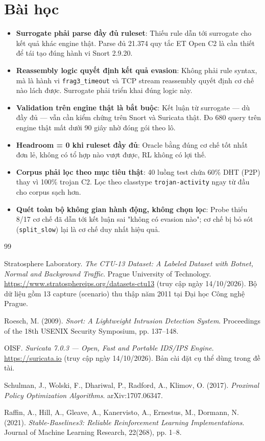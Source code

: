 \documentclass[12pt, a4paper, openany]{book}
\begin{document}
\section{Bài học}

\begin{itemize}
    \item \textbf{Surrogate phải parse đầy đủ ruleset}: Thiếu rule dẫn tới surrogate cho kết quả khác engine thật. Parse đủ 21.374 quy tắc ET Open C2 là cần thiết để tái tạo đúng hành vi Snort 2.9.20.
    \item \textbf{Reassembly logic quyết định kết quả evasion}: Không phải rule syntax, mà là hành vi \texttt{frag3\_timeout} và TCP stream reassembly quyết định cơ chế nào lách được. Surrogate phải triển khai đúng logic này.
    \item \textbf{Validation trên engine thật là bắt buộc}: Kết luận từ surrogate — dù đầy đủ — vẫn cần kiểm chứng trên Snort và Suricata thật. Đo 680 query trên engine thật mất dưới 90 giây nhờ đóng gói theo lô.
    \item \textbf{Headroom = 0 khi ruleset đầy đủ}: Oracle bằng đúng cơ chế tốt nhất đơn lẻ, không có tổ hợp nào vượt được, RL không có lợi thế.
    \item \textbf{Corpus phải lọc theo mục tiêu thật}: 40 luồng test chứa 60\% DHT (P2P) thay vì 100\% trojan C2. Lọc theo classtype \texttt{trojan-activity} ngay từ đầu cho corpus sạch hơn.
    \item \textbf{Quét toàn bộ không gian hành động, không chọn lọc}: Probe thiếu 8/17 cơ chế đã dẫn tới kết luận sai "không có evasion nào"; cơ chế bị bỏ sót (\texttt{split\_slow}) lại là cơ chế duy nhất hiệu quả.
\end{itemize}

\backmatter

\begin{thebibliography}{99}

 Stratosphere Laboratory. \textit{The CTU-13 Dataset: A Labeled Dataset with Botnet, Normal and Background Traffic}. Prague University of Technology. \url{https://www.stratosphereips.org/datasets-ctu13} (truy cập ngày 14/10/2026). Bộ dữ liệu gồm 13 capture (scenario) thu thập năm 2011 tại Đại học Công nghệ Prague.

 Roesch, M. (2009). \textit{Snort: A Lightweight Intrusion Detection System}. Proceedings of the 18th USENIX Security Symposium, pp. 137--148.

 OISF. \textit{Suricata 7.0.3 --- Open, Fast and Portable IDS/IPS Engine}. \url{https://suricata.io} (truy cập ngày 14/10/2026). Bản cài đặt cụ thể dùng trong đề tài.

 Schulman, J., Wolski, F., Dhariwal, P., Radford, A., Klimov, O. (2017). \textit{Proximal Policy Optimization Algorithms}. arXiv:1707.06347.

 Raffin, A., Hill, A., Gleave, A., Kanervisto, A., Ernestus, M., Dormann, N. (2021). \textit{Stable-Baselines3: Reliable Reinforcement Learning Implementations}. Journal of Machine Learning Research, 22(268), pp. 1--8.

\end{thebibliography}
\end{document}
